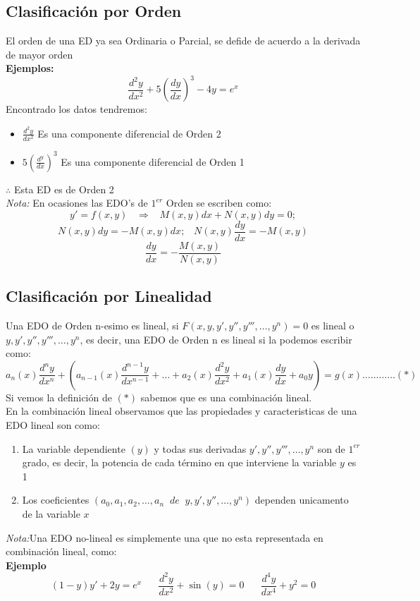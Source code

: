 \documentclass[10pt]{article}
\begin{document}
\subsection{Clasificación por Orden}
El orden de una ED ya sea Ordinaria o Parcial, se defide de acuerdo a la derivada de mayor orden\\
\textbf{Ejemplos:}
\[\frac{d^{2}y}{dx^{2}}+5\left(\frac{dy}{dx}\right)^{3}-4y=e^{x}\]
Encontrado los datos tendremos:
\begin{itemize}
  \item $\frac{d^{2}y}{dx^{2}}$ Es una componente diferencial de Orden 2
  \item $5\left(\frac{d^y}{dx}\right)^{3}$ Es una componente diferencial de Orden 1
\end{itemize}
$\therefore$ Esta ED es de Orden 2\\
\textit{Nota:} En ocasiones las EDO's de $1^{er}$ Orden se escriben como:
\[y'=f(x,y) \;\;\;\Rightarrow\;\;\; M(x,y)dx+N(x,y)dy=0;\]
\[N(x,y)dy=-M(x,y)dx;\;\;\;N(x,y)\frac{dy}{dx}=-M(x,y)\]
\[\frac{dy}{dx}=-\frac{M(x,y)}{N(x,y)}\]

\subsection{Clasificación por Linealidad}
Una EDO de Orden n-esimo es lineal, si $F(x,y,y',y'',y''',\ldots,y^{n})=0$ es lineal o $y,y',y'',y''' ,\ldots,y^{n}$, es decir, una EDO de Orden n es lineal si la podemos escribir como:
\[a_{n}(x)\frac{d^{n}y}{dx^{n}}+\left( a_{n-1}(x)\frac{d^{n-1}y}{dx^{n-1}}+\ldots+a_{2}(x)\frac{d^{2}y}{dx^{2}}+a_{1}(x)\frac{dy}{dx}+a_{0}y\right)=g(x)\ldots\ldots\ldots\ldots(*)\]
Si vemos la definición de $(*)$ sabemos que es una combinación lineal.\\
En la combinación lineal observamos que las propiedades y caracteristicas de una EDO lineal son como:
\begin{enumerate}
  \item La variable dependiente $(y)$ y todas sus derivadas $y',y'',y''',\ldots,y^{n}$ son de $1^{er}$ grado, es decir, la potencia de cada término en que interviene la variable $y$ es 1
  \item Los coeficientes $\left(a_{0},a_{1},a_{2},\ldots,a_{n}\;\;de\;\;y,y',y'',\ldots,y^{n}\right)$ dependen unicamento de la variable $x$
\end{enumerate}
\textit{Nota:}Una EDO no-lineal es simplemente una que no esta representada en combinación lineal, como:\\
\textbf{Ejemplo}
\[(1-y)y'+2y=e^{x}\;\;\;\;\;\;\frac{d^{2}y}{dx^{2}}+\sin(y)=0\;\;\;\;\;\;\frac{d^{4}y}{dx^{4}}+y^{2}=0\]
\clearpage
\end{document}
